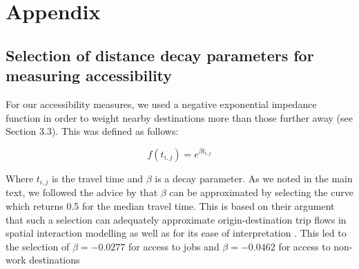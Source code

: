 \section*{Appendix}

\subsection*{Selection of distance decay parameters for measuring accessibility}


For our accessibility measures, we used a negative exponential impedance function in order to weight nearby destinations more than those further away (see Section 3.3). This was defined as follows:

\[f(t_{i,j}) = e^{\beta t_{i,j}}\]

Where $t_{i,j}$ is the travel time and $\beta$ is a decay parameter. As we noted in the main text, we followed the advice by  that $\beta$ can be approximated by selecting the curve which returns 0.5 for the median travel time. This is based on their argument that such a selection can adequately approximate origin-destination trip flows in spatial interaction modelling as well as for its ease of interpretation \cite{osth_new_2016}. This led to the selection of $\beta = -0.0277$ for access to jobs and $\beta = -0.0462$ for access to non-work destinations

